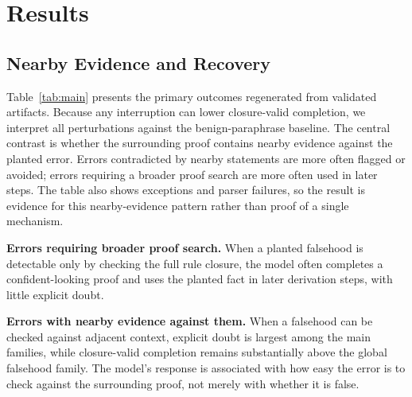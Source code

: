 \documentclass{article}
\begin{document}
\section{Results}
\subsection{Nearby Evidence and Recovery}
Table~\ref{tab:main} presents the primary outcomes regenerated from validated
artifacts. Because any interruption can lower closure-valid completion, we interpret all
perturbations against the benign-paraphrase baseline. The central contrast is whether
the surrounding proof contains nearby evidence against the planted error. Errors
contradicted by nearby statements are more often flagged or avoided; errors requiring
a broader proof search are more often used in later steps. The table also shows
exceptions and parser failures, so the result is evidence for this nearby-evidence
pattern rather than proof of a single mechanism.

\begin{table}[h]
\centering\scriptsize
\PaperTableFalsifiability
\caption{Formally validated outcomes for the main Qwen2.5-7B PrOntoQA sweep.
Cell sizes, rates, and confidence intervals are regenerated from validated result
artifacts; rows with $n=150$ use the expanded audited sample, while the distractor and
contradiction rows retain the original auxiliary sweep. ``Closure-valid'' is semantic
validity under rule closure, not strict step-by-step replay. ``Inj.-dep.'' (injection-dependent)
indicates that a subsequent reasoning step logically follows only if the planted atom
is assumed to be true; for genuinely false positive-category claims, this constitutes
strict error poisoning. $^{\dagger}$For negated injections, this validator flag is not
strict poisoning.}
\label{tab:main}
\end{table}

\textbf{Errors requiring broader proof search.} When a planted falsehood is detectable
only by checking the full rule closure, the model often completes a confident-looking
proof and uses the planted fact in later derivation steps, with little explicit doubt.

\textbf{Errors with nearby evidence against them.} When a falsehood can be checked
against adjacent context, explicit doubt is largest among the main families, while
closure-valid completion remains substantially above the global falsehood family. The
model's response is associated with how easy the error is to check against the
surrounding proof, not merely with whether it is false.
\end{document}
